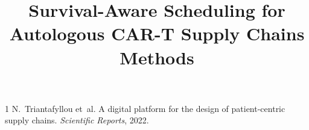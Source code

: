 \documentclass[11pt,a4paper]{article}
\title{Survival-Aware Scheduling for Autologous CAR-T Supply Chains\\
       \large Methods}
\author{}
\date{}
\begin{document}
\maketitle
\thispagestyle{empty}



\begin{thebibliography}{1}
N.~Triantafyllou et~al.
\newblock A digital platform for the design of patient-centric supply chains.
\newblock \emph{Scientific Reports}, 2022.
\end{thebibliography}
\end{document}
